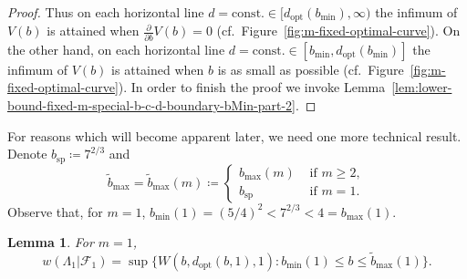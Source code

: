 \documentclass[a4paper]{amsart} %
\newtheorem{lemma}[theorem]{Lemma}
\theoremstyle{definition}
\theoremstyle{remark}
\numberwithin{equation}{section}
\newcommand*{\weakconstrestricted}[2]{w(#1|#2)} %
\newcommand*{\fclassspec}[1]{\mathcal{F}_{#1}}
\newcommand*{\XXXspecialbd}{W}
\newcommand*{\XXXspecialbdDenominator}{V}
\newcommand*{\bMin}{b_{\min}}
\newcommand*{\bMax}{b_{\max}}
\newcommand*{\dOpt}{d_{\mathrm{opt}}}
\newcommand*{\bSh}{b_{\operatorname{sp}}}
\newcommand*{\bMaxTilde}{\widetilde{b}_{\max}}
\begin{document}
\begin{proof}
	Thus on each horizontal line $d= \text{const.} \in [\dOpt(\bMin), \infty)$
	the infimum of $\XXXspecialbdDenominator(b)$ is attained when
	$\frac{\partial }{\partial  b} \XXXspecialbdDenominator(b) = 0$ (cf.\ Figure~\ref{fig:m-fixed-optimal-curve}).
	On the other hand,
	on each horizontal line $d= \text{const.} \in [\bMin, \dOpt(\bMin)]$
	the infimum of $\XXXspecialbdDenominator(b)$ is attained  when $b$ is as small as possible (cf.\ Figure~\ref{fig:m-fixed-optimal-curve}).
	In order to finish the proof we invoke Lemma~\ref{lem:lower-bound-fixed-m-special-b-c-d-boundary-bMin-part-2}.   
\end{proof}


For reasons which will become apparent later, we  need one more technical result.
Denote $\bSh \coloneqq 7^{2/3}$
and
\begin{equation}
\label{eq:def-bMaxTilde}
\bMaxTilde = \bMaxTilde(m)
\coloneqq
\begin{cases}
\bMax(m) & \text{ if } m\geq 2,\\
\bSh & \text{ if } m = 1.
\end{cases}
\end{equation}
Observe that, for $m=1$,
$\bMin(1) = (5/4)^2 < 7^{2/3} < 4 = \bMax(1)$.

\begin{lemma}
	\label{lem:m=1-optimal-curve-far-end}
	For $m=1$,
	\begin{equation*}
	\weakconstrestricted{\Lambda_1}{\fclassspec{1}} 
	= 	\sup\bigl\{
	\XXXspecialbd(b,\dOpt(b,1),1) : \bMin(1) \leq b \leq \bMaxTilde(1) \bigr\}.	
	\end{equation*}
\end{lemma}
\end{document}
